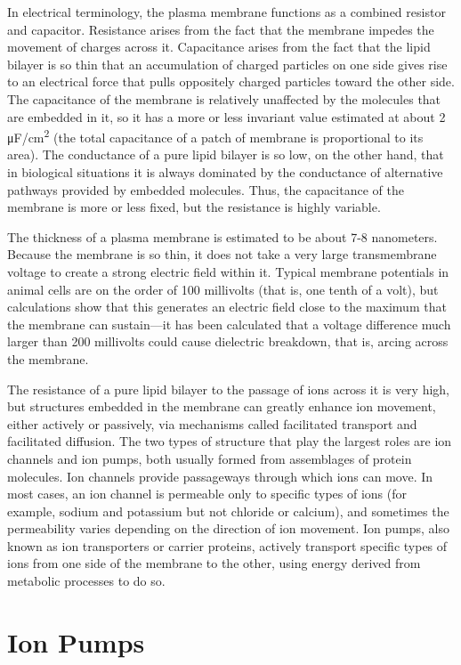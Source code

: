 \documentclass[]{book}
\begin{document}
In electrical terminology, the plasma membrane functions as a combined resistor and capacitor. Resistance arises from the fact that the membrane impedes the movement of charges across it. Capacitance arises from the fact that the lipid bilayer is so thin that an accumulation of charged particles on one side gives rise to an electrical force that pulls oppositely charged particles toward the other side. The capacitance of the membrane is relatively unaffected by the molecules that are embedded in it, so it has a more or less invariant value estimated at about 2 μF/cm\textsuperscript{2} (the total capacitance of a patch of membrane is proportional to its area). The conductance of a pure lipid bilayer is so low, on the other hand, that in biological situations it is always dominated by the conductance of alternative pathways provided by embedded molecules. Thus, the capacitance of the membrane is more or less fixed, but the resistance is highly variable.

The thickness of a plasma membrane is estimated to be about 7-8 nanometers. Because the membrane is so thin, it does not take a very large transmembrane voltage to create a strong electric field within it. Typical membrane potentials in animal cells are on the order of 100 millivolts (that is, one tenth of a volt), but calculations show that this generates an electric field close to the maximum that the membrane can sustain---it has been calculated that a voltage difference much larger than 200 millivolts could cause dielectric breakdown, that is, arcing across the membrane.

The resistance of a pure lipid bilayer to the passage of ions across it is very high, but structures embedded in the membrane can greatly enhance ion movement, either actively or passively, via mechanisms called facilitated transport and facilitated diffusion. The two types of structure that play the largest roles are ion channels and ion pumps, both usually formed from assemblages of protein molecules. Ion channels provide passageways through which ions can move. In most cases, an ion channel is permeable only to specific types of ions (for example, sodium and potassium but not chloride or calcium), and sometimes the permeability varies depending on the direction of ion movement. Ion pumps, also known as ion transporters or carrier proteins, actively transport specific types of ions from one side of the membrane to the other, using energy derived from metabolic processes to do so.

\hypertarget{ion-pumps}{%
\section{Ion Pumps}\label{ion-pumps}}
\end{document}
